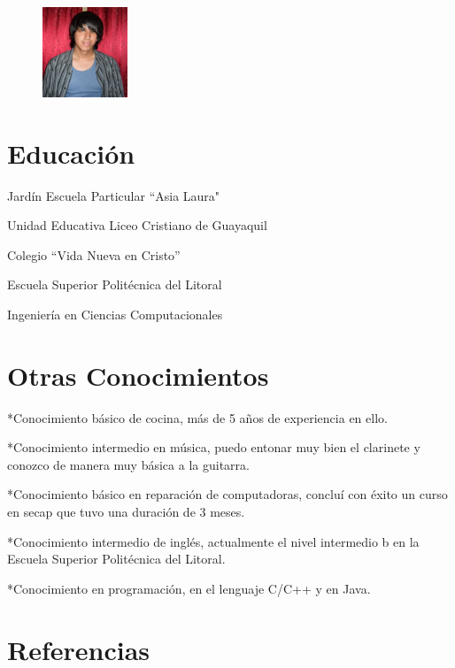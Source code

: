 \documentclass{res}
\begin{document}
\address{Sauces 8 Mz 454 Villa 2\\
\ \ \ \ Guayaquil-Ecuador\\
\ \ \ \ \ \ \ \ \ \ 084287897}
\begin{figure}
\includegraphics[totalheight=1.2in,width=1in]{CVPicture} %
\end{figure}

\begin{resume}
\vspace{0.4in}
\section{\large Educaci\'on}
\vspace{0.2in}

       Jard\'in Escuela Particular ``Asia Laura"  

       Unidad Educativa Liceo Cristiano de Guayaquil
       \vspace{-0.15in} 

       \hspace{1in} Colegio ``Vida Nueva en Cristo''  

       Escuela Superior Polit\'ecnica del Litoral  
       \vspace{-0.15in} 

       \hfill{Ingenier\'ia en Ciencias Computacionales}
\vspace{-0.15in}
\section{\large Otras Conocimientos}
\vspace{0.2in}
       *Conocimiento b\'asico de cocina, m\'as de 5 a\~nos de experiencia en ello. 

       *Conocimiento intermedio en m\'usica, puedo entonar muy bien el clarinete y conozco de manera muy b\'asica a la guitarra.

       *Conocimiento b\'asico en reparaci\'on de computadoras, conclu\'i con \'exito un curso en secap que tuvo una duraci\'on de 3 meses. 

       *Conocimiento intermedio de ingl\'es, actualmente el nivel intermedio b en la Escuela Superior Polit\'ecnica del Litoral.

       *Conocimiento en programaci\'on, en el lenguaje C/C++ y en Java.
\vspace{-0.15in}
\section{\large Referencias}
\vspace{0.2in}

\end{resume}
\end{document}
